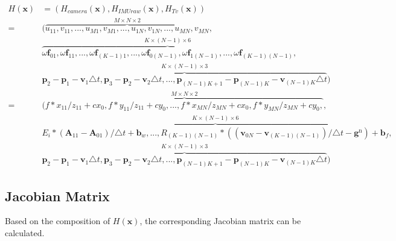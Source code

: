 \documentclass[12pt]{article}   %
\begin{document}
\begin{appendices}
\begin{align} %
H(\textbf{x}) &= (H_{camera}(\textbf{x}), H_{IMUraw}(\textbf{x}), H_{Tv}(\textbf{x})) \nonumber \\
=& (\overbrace{{u}_{11}, {v}_{11}, ... , {u}_{M1}, {v}_{M1}, ..., {u}_{1N}, {v}_{1N}, ... , {u}_{MN}, {v}_{MN}}^{M \times N \times 2}, \nonumber \\ 
& \overbrace{\omega\textbf{f}_{01}, \omega\textbf{f}_{11}, ... , \omega\textbf{f}_{(K-1)1}, ..., \omega\textbf{f}_{0(N-1)}, \omega\textbf{f}_{1(N-1)}, ... , \omega\textbf{f}_{(K-1)(N-1)}}^{K \times (N-1) \times 6}, \nonumber \\
& \overbrace{\textbf{p}_2 - \textbf{p}_{1} - \textbf{v}_{1} \triangle t, \textbf{p}_{3} - \textbf{p}_{2} - \textbf{v}_{2} \triangle t, ... , \textbf{p}_{(N-1)K+1} - \textbf{p}_{(N-1)K} - \textbf{v}_{(N-1)K} \triangle t}^{K \times (N-1) \times 3}) \nonumber \\
=& (\overbrace{f * x_{11} / z_{11} + cx_0, f * y_{11} / z_{11} + cy_0, ... , f * x_{MN} / z_{MN} + cx_0, f * y_{MN} / z_{MN} + cy_0, }^{M \times N \times 2}, \nonumber \\ 
& \overbrace{E_i*(\textbf{A}_{11} - \textbf{A}_{01})/\triangle t + \textbf{b}_w, ..., R_{(K-1)(N-1)} * ((\textbf{v}_{0N} - \textbf{v}_{(K-1)(N-1)}) / \triangle t - \textbf{g}^{\mathrm{n}}) + \textbf{b}_f}^{K \times (N-1) \times 6}, \nonumber \\
& \overbrace{\textbf{p}_2 - \textbf{p}_{1} - \textbf{v}_{1} \triangle t, \textbf{p}_{3} - \textbf{p}_{2} - \textbf{v}_{2} \triangle t, ... , \textbf{p}_{(N-1)K+1} - \textbf{p}_{(N-1)K} - \textbf{v}_{(N-1)K} \triangle t}^{K \times (N-1) \times 3}) 
\end{align}

\subsection{Jacobian Matrix}

Based on the composition of $H(\textbf{x})$, the corresponding Jacobian matrix
can be calculated. 


\end{appendices}
\end{document}

